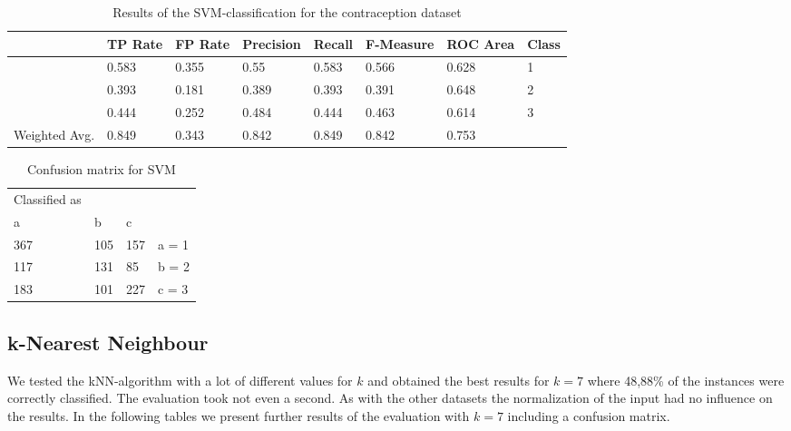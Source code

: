 \documentclass[paper=a4, fontsize=11pt]{scrartcl} %
\numberwithin{equation}{section} %
\numberwithin{figure}{section} %
\numberwithin{table}{section} %
\begin{document}
\begin{table}[h]
\centering
\begin{tabular}{|llllllll|}
	\hline
	&								TP Rate   	&FP Rate   &Precision   &Recall  &F-Measure   &ROC Area  	&Class\\
	\hline
									&0.583     	&0.355     &0.55      	&0.583   &0.566   		&0.628    	&1\\
                 	&0.393     	&0.181     &0.389     	&0.393   &0.391      	&0.648    	&2\\
                 	&0.444     	&0.252     &0.484     	&0.444   &0.463      	&0.614    	&3\\
  \hline
	Weighted Avg.   & 0.849    & 0.343      &0.842   &  0.849     &0.842     & 0.753			&\\
	\hline
\end{tabular}
\caption{Results of the SVM-classification for the contraception dataset}
\end{table}

\vspace{6pt}

\begin{table}[h]
\centering
\begin{tabular}{|llll|}
	\hline
	Classified as	& & &\\
	a		&	b & c& \\
	\hline
	367 &105 &157 &   a = 1\\
 	117 &131 &85 	&   b = 2\\
 	183 &101 &227 &   c = 3\\
  \hline
\end{tabular}
\caption{Confusion matrix for SVM}
\end{table}

\subsection{k-Nearest Neighbour}

We tested the kNN-algorithm with a lot of different values for $k$ and obtained the best results for $k=7$ where 48,88\% of the instances were correctly classified. The evaluation took not even a second. As with the other datasets the normalization of the input had no influence on the results. In the following tables we present further results of the evaluation with $k=7$ including a confusion matrix.
\end{document}
